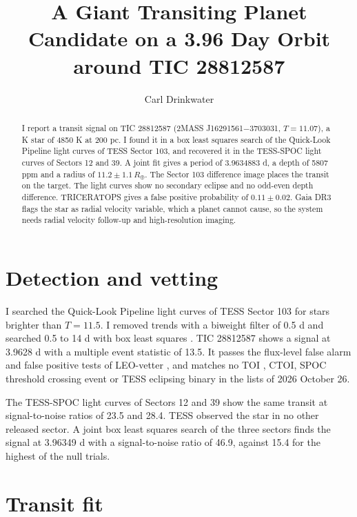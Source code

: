 \documentclass{aastex701}
\begin{document}
\title{A Giant Transiting Planet Candidate on a 3.96 Day Orbit around TIC 28812587}

\author[0000-0000-0000-0000]{Carl Drinkwater}

\begin{abstract}
I report a transit signal on TIC 28812587 (2MASS J16291561$-$3703031, $T=11.07$), a K star of 4850 K at 200 pc.
I found it in a box least squares search of the Quick-Look Pipeline light curves of TESS Sector 103, and recovered it
in the TESS-SPOC light curves of Sectors 12 and 39. A joint fit gives a period of 3.9634883 d, a depth of 5807 ppm and
a radius of $11.2 \pm 1.1\,R_\oplus$. The Sector 103 difference image places the transit on the target. The light
curves show no secondary eclipse and no odd-even depth difference. TRICERATOPS gives a false positive probability of
$0.11 \pm 0.02$. Gaia DR3 flags the star as radial velocity variable, which a planet cannot cause, so the system needs
radial velocity follow-up and high-resolution imaging.
\end{abstract}

\section{Detection and vetting}

I searched the Quick-Look Pipeline \citep[QLP;][]{huang2020a,huang2020b,kunimoto2021} light curves of TESS
\citep{ricker2015} Sector 103 for stars brighter than $T=11.5$. I removed trends with a biweight filter of 0.5 d
\citep{hippke2019} and searched 0.5 to 14 d with box least squares \citep{kovacs2002}. TIC 28812587 \citep{stassun2019}
shows a signal at 3.9628 d with a multiple event statistic of 13.5. It passes the flux-level false alarm and false
positive tests of LEO-vetter \citep{kunimoto2025}, and matches no TOI \citep{guerrero2021}, CTOI, SPOC threshold
crossing event or TESS eclipsing binary \citep{prsa2022} in the lists of 2026 October 26.

The TESS-SPOC light curves \citep{caldwell2020} of Sectors 12 and 39 show the same transit at signal-to-noise ratios of
23.5 and 28.4. TESS observed the star in no other released sector. A joint box least squares search of the three
sectors finds the signal at 3.96349 d with a signal-to-noise ratio of 46.9, against 15.4 for the highest of the null
trials.

\section{Transit fit}
\end{document}
